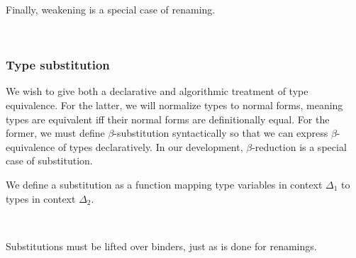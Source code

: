 \documentclass[authoryear, acmsmall, screen, review, nonacm]{acmart}
\begin{document}
Finally, weakening is a special case of renaming.

\begin{code}%
\>[0]\AgdaSpace{}%
\AgdaSymbol{:}\AgdaSpace{}%
\AgdaSpace{}%
\AgdaSpace{}%
\AgdaSpace{}%
\AgdaSpace{}%
\AgdaSpace{}%
\AgdaSymbol{(}\AgdaSpace{}%
\AgdaOperator{\AgdaInductiveConstructor{,,}}\AgdaSpace{}%
\AgdaSymbol{)}\AgdaSpace{}%
\<%
\\
\>[0]\AgdaSpace{}%
\AgdaSymbol{=}\AgdaSpace{}%
\AgdaSpace{}%
\<%
\end{code}

\subsubsection{Type substitution}

We wish to give both a declarative and algorithmic treatment of type equivalence. For the latter, we will normalize types to normal forms, meaning types are equivalent iff their normal forms are definitionally equal. For the former, we must define $\beta$-substitution syntactically so that we can express $\beta$-equivalence of types declaratively. In our development, $\beta$-reduction is a special case of substitution.

We define a substitution as a function mapping type variables in context $\Delta_1$ to types in context $\Delta_2$.

\begin{code}%
\>[0]\AgdaSpace{}%
\AgdaSymbol{:}\AgdaSpace{}%
\AgdaSpace{}%
\AgdaSpace{}%
\AgdaSpace{}%
\AgdaSpace{}%
\<%
\\
\>[0]\AgdaSpace{}%
\AgdaSpace{}%
\AgdaSpace{}%
\AgdaSymbol{=}\AgdaSpace{}%
\AgdaSpace{}%
\AgdaSymbol{\{}\AgdaSymbol{\}}\AgdaSpace{}%
\AgdaSpace{}%
\AgdaSpace{}%
\AgdaSpace{}%
\AgdaSpace{}%
\AgdaSpace{}%
\AgdaSpace{}%
\AgdaSpace{}%
\<%
\end{code}

Substitutions must be lifted over binders, just as is done for renamings. 
\end{document}
